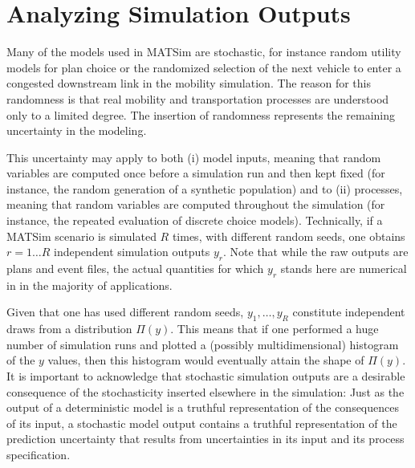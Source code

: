 \section{\label{sec:Statistical-analysis-of}Analyzing Simulation Outputs}

%

Many of the models used in MATSim are stochastic, for instance random
utility models for plan choice or the randomized selection of the
next vehicle to enter a congested downstream link in the mobility
simulation. The reason for this randomness is that real mobility and
transportation processes are understood only to a limited degree.
The insertion of randomness represents the remaining uncertainty in
the modeling. 

This uncertainty may apply to both (i) model inputs, meaning that
random variables are computed once before a simulation run and then
kept fixed (for instance, the random generation of a synthetic population)
and to (ii) processes, meaning that random variables are computed
throughout the simulation (for instance, the repeated evaluation of
discrete choice models). Technically, if a MATSim scenario is simulated
$R$ times, with different random seeds, one obtains $r=1\ldots R$
independent simulation outputs $y_{r}$. Note that while the raw outputs
are plans and event files, the actual quantities for which $y_{r}$
stands here are numerical in in the majority of applications.

Given that one has used different random seeds, $y_{1},\ldots,y_{R}$
constitute independent draws from a distribution $\Pi(y)$. This means
that if one performed a huge number of simulation runs and plotted
a (possibly multidimensional) histogram of the $y$ values, then this
histogram would eventually attain the shape of $\Pi(y)$. It is important
to acknowledge that stochastic simulation outputs are a desirable
consequence of the stochasticity inserted elsewhere in the simulation:
Just as the output of a deterministic model is a truthful representation
of the consequences of its input, a stochastic model output contains
a truthful representation of the prediction uncertainty that results
from uncertainties in its input and its process specification.

